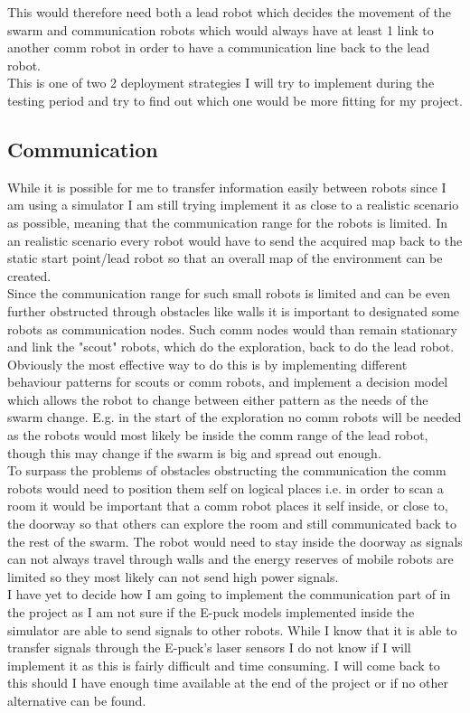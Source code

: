 This would therefore need both a lead robot which decides the movement of the swarm and communication robots which would always have at least 1 link to another comm robot in order to have a communication line back to the lead robot. \\
This is one of two 2 deployment strategies I will try to implement during the testing period and try to find out which one would be more fitting for my project.\\[3ex]



\subsection{Communication}
While it is possible for me to transfer information easily between robots since I am using a simulator I am still trying implement it as close to a realistic scenario as possible, meaning that the communication range for the robots is limited. In an realistic scenario every robot would have to send the acquired map back to the static start point/lead robot so that an overall map of the environment can be created. \\
Since the communication range for such small robots is limited and can be even further obstructed through obstacles like walls it is important to designated some robots as communication nodes. Such comm nodes would than remain stationary and link the "scout" robots, which do the exploration, back to do the lead robot. \\
Obviously the most effective way to do this is by implementing different behaviour patterns for scouts or comm robots, and implement a decision model which allows the robot to change between either pattern as the needs of the swarm change. E.g. in the start of the exploration no comm robots will be needed as the robots would most likely be inside the comm range of the lead robot, though this may change if the swarm is big and spread out enough. \\[3ex]

To surpass the problems of obstacles obstructing the communication the comm robots would need to position them self on logical places i.e. in order to scan a room it would be important that a comm robot places it self inside, or close to, the doorway so that others can explore the room and still communicated back to the rest of the swarm. The robot would need to stay inside the doorway as signals can not always travel through walls and the energy reserves of mobile robots are limited so they most likely can not send high power signals. \\
I have yet to decide how I am going to implement the communication part of in the project as I am not sure if the E-puck models implemented inside the simulator are able to send signals to other robots. While I know that it is able to transfer signals through the E-puck's laser sensors I do not know if I will implement it as this is fairly difficult and time consuming. I will come back to this should I have enough time available at the end of the project or if no other alternative can be found.\\[3ex]


